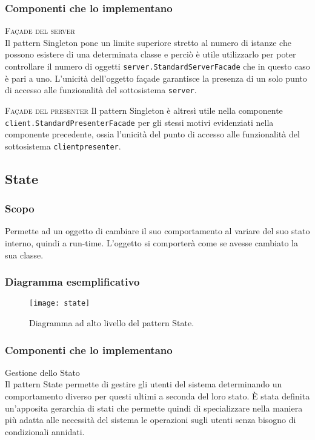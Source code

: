 \subsubsection{Componenti che lo implementano}
\begin{description}
  \item{\scshape\ttfamily Façade del server}\\
Il pattern Singleton pone un limite superiore stretto al numero di istanze che possono esistere di una determinata classe e perciò è utile utilizzarlo per poter controllare il numero di oggetti \texttt{server.StandardServerFacade} che in questo caso è pari a uno. L'unicità dell'oggetto façade garantisce la presenza di un solo punto di accesso alle funzionalità del sottosistema \texttt{server}.
  \item{\scshape\ttfamily Façade del presenter}
Il pattern Singleton è altresì utile nella componente \texttt{client.StandardPresenterFacade} per gli stessi motivi evidenziati nella componente precedente, ossia l'unicità del punto di accesso alle funzionalità del sottosistema \texttt{clientpresenter}.
\end{description}

\subsection{State}
\subsubsection{Scopo}
Permette ad un oggetto di cambiare il suo comportamento al variare del suo stato interno, quindi a run-time. L'oggetto si comporterà come se avesse cambiato la sua classe.

\subsubsection{Diagramma esemplificativo}
\begin{figure}[h]
\centering
\texttt{[image: state]}
\caption{Diagramma ad alto livello del pattern State.}\label{fig:state}
\end{figure}

\subsubsection{Componenti che lo implementano}
\begin{description}
\item{Gestione dello Stato}\\
Il pattern State permette di gestire gli utenti del sistema determinando un comportamento diverso per questi ultimi a seconda del loro stato. È stata definita un'apposita gerarchia di stati che permette quindi di specializzare nella maniera più adatta alle necessità del sistema le operazioni sugli utenti senza bisogno di condizionali annidati.
\end{description}
\clearpage

